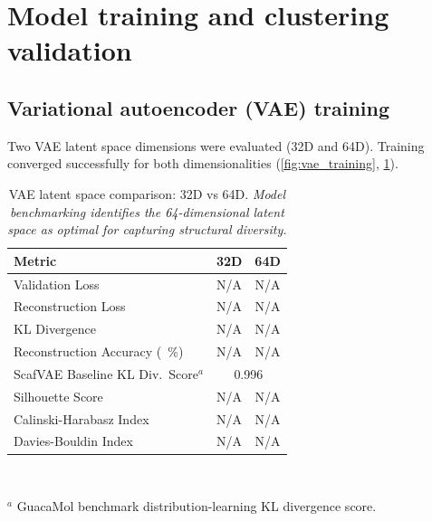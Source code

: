 \documentclass[journal=jcisd8,manuscript=suppinfo]{achemso}
\begin{document}
\clearpage

\section*{Model training and clustering validation}

\subsection*{Variational autoencoder (VAE) training}

Two VAE latent space dimensions were evaluated (32D and 64D). Training converged successfully for both dimensionalities (\cref{fig:vae_training}, \cref{tab:vae_comparison}).

\begin{table}[ht]
\centering  \caption{VAE latent space comparison: 32D vs 64D. \textit{Model benchmarking identifies the 64-dimensional latent space as optimal for capturing structural diversity.}}
\label{tab:vae_comparison}
\small
\begin{tabular}{lcc}
\toprule
\textbf{Metric} & \textbf{32D} & \textbf{64D} \\
\midrule
Validation Loss & N/A & N/A \\
Reconstruction Loss & N/A & N/A \\
KL Divergence & N/A & N/A \\
Reconstruction Accuracy (\qty{}{\percent}) & N/A & N/A \\
ScafVAE Baseline KL Div.\ Score$^a$ \cite{tiejundong2023scafvae} & \multicolumn{2}{c}{\num{0.996}} \\
\midrule
Silhouette Score & N/A & N/A \\
Calinski-Harabasz Index & N/A & N/A \\
Davies-Bouldin Index & N/A & N/A \\
\bottomrule
\end{tabular}
\vspace{0.3em}\\
\begin{footnotesize}
$^a$ GuacaMol benchmark distribution-learning KL divergence score.
\end{footnotesize}
\end{table}
\end{document}
